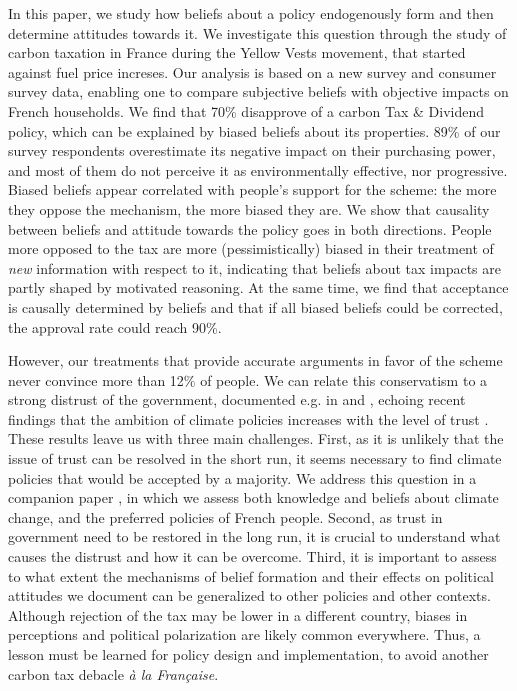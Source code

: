 \documentclass[11pt]{article}
\begin{document}

In this paper, we study how beliefs about a policy endogenously form and then determine attitudes towards it. We investigate this question through the study of carbon taxation in France during the Yellow Vests movement, that started against fuel price increses. Our analysis is based on a new survey and consumer survey data, enabling one to compare subjective beliefs with objective impacts on French households. We find that 70\% disapprove of a carbon Tax \& Dividend policy, which can be explained by biased beliefs about its properties. 89\% of our survey respondents overestimate its negative impact on their purchasing power, and most of them do not perceive it as environmentally effective, nor progressive. Biased beliefs appear correlated with people’s support for the scheme: the more they oppose the mechanism, the more biased they are. We show that causality between beliefs and attitude towards the policy goes in both directions. People more opposed to the tax are more (pessimistically) biased in their treatment of \textit{new} information with respect to it, indicating that beliefs about tax impacts are partly shaped by motivated reasoning. At the same time, we find that acceptance is causally determined by beliefs and that if all biased beliefs could be corrected, the approval rate could reach 90\%.

However, our treatments that provide accurate arguments in favor of the scheme never convince more than 12\% of people. We can relate this conservatism to a strong distrust of the government, documented e.g. in \citet{alesina_intergenerational_2018} and \citet{algan_et_al_19}, echoing recent findings that the ambition of climate policies increases with the level of trust \citep{rafaty_perceptions_2018}. These results leave us with three main challenges. First, as it is unlikely that the issue of trust can be resolved in the short run, it seems necessary to find climate policies that would be accepted by a majority. We address this question in a companion paper \citep{douenne_french_2019}, in which we assess both knowledge and beliefs about climate change, and the preferred policies of French people. Second, as trust in government need to be restored in the long run, it is crucial to understand what causes the distrust and how it can be overcome. Third, it is important to assess to what extent the mechanisms of belief formation and their effects on political attitudes we document can be generalized to other policies and other contexts. Although rejection of the tax may be lower in a different country, biases in perceptions and political polarization are likely common everywhere. Thus, a lesson must be learned for policy design and implementation, to avoid another carbon tax debacle \textit{à la Française}.
\end{document}
